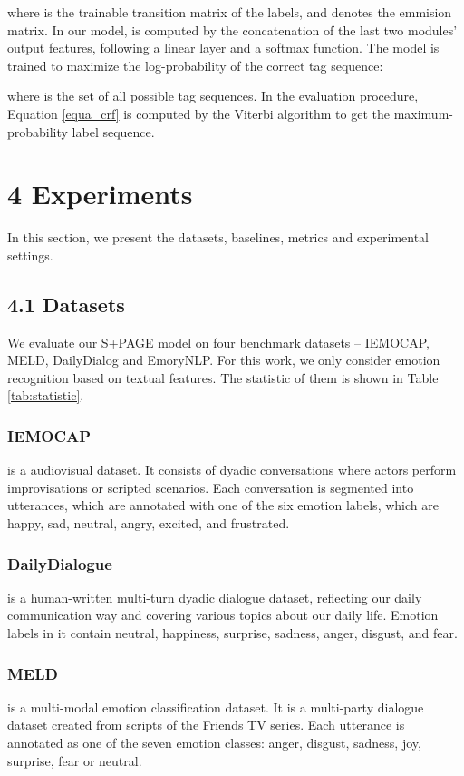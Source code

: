 \documentclass[letterpaper]{article} \usepackage{aaai22}  \usepackage{times}  \usepackage{helvet}  \usepackage{courier}  \usepackage[hyphens]{url}  \usepackage{graphicx} \urlstyle{rm} \def\UrlFont{\rm}  \usepackage{natbib}  \usepackage{caption} \DeclareCaptionStyle{ruled}{labelfont=normalfont,labelsep=colon,strut=off} \frenchspacing  \setlength{\pdfpagewidth}{8.5in}  \setlength{\pdfpageheight}{11in}  \usepackage{algorithm}
\begin{document}
 
where  is the trainable transition matrix of the labels, and  denotes the emmision matrix. In our model,  is computed by the concatenation of the last two modules' output features, following a linear layer and a softmax function. The model is trained to maximize the log-probability of the correct tag sequence:



where  is the set of all possible tag sequences. In the evaluation procedure, Equation \ref{equa_crf} is computed by the Viterbi algorithm \cite{rabiner} to get the maximum-probability label sequence. 


\section{4 Experiments}
In this section, we present the datasets, baselines, metrics and experimental settings.

\subsection{4.1 Datasets}
We evaluate our S+PAGE model on four benchmark datasets -- IEMOCAP, MELD, DailyDialog and EmoryNLP. For this work, we only consider emotion recognition based on textual features. The statistic of them is shown in Table \ref{tab:statistic}.

\subsubsection{IEMOCAP \cite{iemocap}} is a audiovisual dataset. It consists of dyadic conversations where actors perform improvisations or scripted scenarios. Each conversation is segmented into utterances, which are annotated with one of the six emotion labels, which are happy, sad, neutral, angry, excited, and frustrated.

\subsubsection{DailyDialogue \cite{dailydialog}} is a human-written multi-turn dyadic dialogue dataset, reflecting our daily communication way and covering various topics about our daily life. Emotion labels in it contain neutral, happiness, surprise, sadness, anger, disgust, and fear.

\subsubsection{MELD \cite{meld}} is a multi-modal emotion classification dataset. It is a multi-party dialogue dataset created from scripts of the Friends TV series. Each utterance is annotated as one of the seven emotion classes: anger, disgust, sadness, joy, surprise, fear or neutral.
\end{document}
